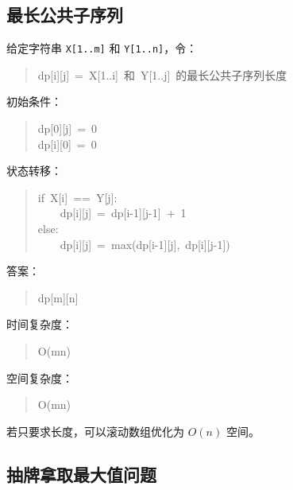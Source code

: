 \documentclass[UTF8,zihao=-4]{ctexart}
\begin{document}
\subsection*{最长公共子序列}

给定字符串 \texttt{X[1..m]} 和 \texttt{Y[1..n]}，令：

\begin{quote}
\small\ttfamily\raggedright
\relax dp[i][j]\ =\ X[1..i]\ 和\ Y[1..j]\ 的最长公共子序列长度\\
\end{quote}

初始条件：

\begin{quote}
\small\ttfamily\raggedright
\relax dp[0][j]\ =\ 0\\
\relax dp[i][0]\ =\ 0\\
\end{quote}

状态转移：

\begin{quote}
\small\ttfamily\raggedright
\relax if\ X[i]\ ==\ Y[j]:\\
\relax \ \ \ \ dp[i][j]\ =\ dp[i-1][j-1]\ +\ 1\\
\relax else:\\
\relax \ \ \ \ dp[i][j]\ =\ max(dp[i-1][j],\ dp[i][j-1])\\
\end{quote}

答案：

\begin{quote}
\small\ttfamily\raggedright
\relax dp[m][n]\\
\end{quote}

时间复杂度：

\begin{quote}
\small\ttfamily\raggedright
\relax O(mn)\\
\end{quote}

空间复杂度：

\begin{quote}
\small\ttfamily\raggedright
\relax O(mn)\\
\end{quote}

若只要求长度，可以滚动数组优化为 $O(n)$ 空间。

\subsection*{抽牌拿取最大值问题}
\end{document}
